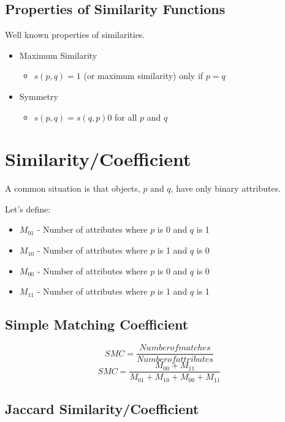 \subsection{Properties of Similarity Functions}
Well known properties of similarities.
\begin{itemize}
    \item Maximum Similarity
    \begin{itemize}
        \item $s(p, q) = 1$ (or maximum similarity) only if $p = q$
    \end{itemize}
    \item Symmetry
    \begin{itemize}
        \item $s(p, q) = s(q, p) 0$ for all $p$ and $q$
    \end{itemize}
\end{itemize}

\section{Similarity/Coefficient}
A common situation is that objects, $p$ and $q$, have only binary attributes.

Let's define:
\begin{itemize}
    \item $M_{01}$ - Number of attributes where $p$ is 0 and $q$ is 1
    \item $M_{10}$ - Number of attributes where $p$ is 1 and $q$ is 0
    \item $M_{00}$ - Number of attributes where $p$ is 0 and $q$ is 0
    \item $M_{11}$ - Number of attributes where $p$ is 1 and $q$ is 1
\end{itemize}


\subsection{Simple Matching Coefficient}

\begin{equation}
    SMC = \frac{Number of matches}{Number of attributes}
\end{equation}
\begin{equation}
    SMC = \frac{M_{00} + M_{11}}{M_{01} + M_{10} + M_{00} + M_{11}}
\end{equation}


\subsection{Jaccard Similarity/Coefficient}

